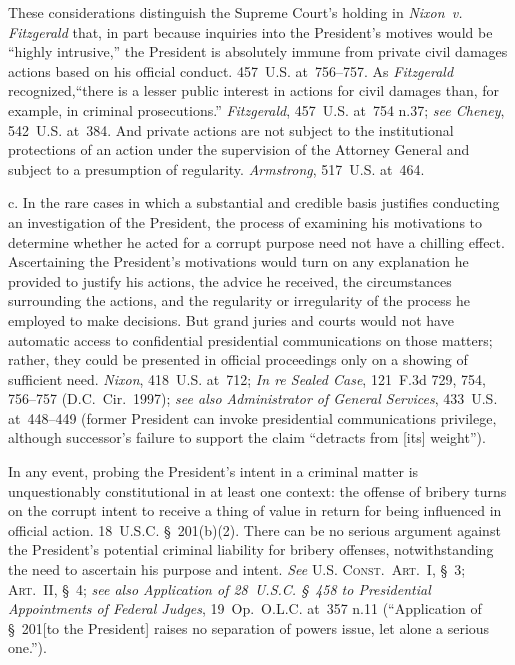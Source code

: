 These considerations distinguish the Supreme Court's holding in \textit{Nixon~v. Fitzgerald} that, in part because inquiries into the President's motives would be ``highly intrusive,'' the President is absolutely immune from private civil damages actions based on his official conduct. 457~U.S. at~756--757.
As \textit{Fitzgerald} recognized,``there is a lesser public interest in actions for civil damages than, for example, in criminal prosecutions.''
\textit{Fitzgerald}, 457~U.S. at~754 n.37; \textit{see Cheney}, 542~U.S. at~384.
And private actions are not subject to the institutional protections of an action under the supervision of the Attorney General and subject to a presumption of regularity.
\textit{Armstrong}, 517~U.S. at~464.

c. In the rare cases in which a substantial and credible basis justifies conducting an investigation of the President, the process of examining his motivations to determine whether he acted for a corrupt purpose need not have a chilling effect.
Ascertaining the President's motivations would turn on any explanation he provided to justify his actions, the advice he received, the circumstances surrounding the actions, and the regularity or irregularity of the process he employed to make decisions.
But grand juries and courts would not have automatic access to confidential presidential communications on those matters; rather, they could be presented in official proceedings only on a showing of sufficient need.
\textit{Nixon}, 418~U.S. at~712;
\textit{In re Sealed Case}, 121~F.3d 729, 754, 756--757 (D.C.~Cir.~1997);
\textit{see also Administrator of General Services}, 433~U.S. at~448--449 (former President can invoke presidential communications privilege, although successor's failure to support the claim ``detracts from [its] weight'').

In any event, probing the President's intent in a criminal matter is unquestionably constitutional in at least one context: the offense of bribery turns on the corrupt intent to receive a thing of value in return for being influenced in official action.
18~U.S.C. \S~201(b)(2).
There can be no serious argument against the President's potential criminal liability for bribery offenses, notwithstanding the need to ascertain his purpose and intent.
\textit{See} \textsc{U.S. Const.\ Art.~I}, \S~3; \textsc{Art.~II}, \S~4;
\textit{see also Application of 28~U.S.C. \S~458 to Presidential Appointments of Federal Judges}, 19~Op.\ O.L.C. at~357 n.11 (``Application of \S~201[to the President] raises no separation of powers issue, let alone a serious one.'').


